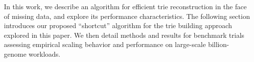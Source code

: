 In this work, we describe an algorithm for efficient trie reconstruction in the face of missing data, and explore its performance characteristics.
The following section introduces our proposed ``shortcut'' algorithm for the trie building approach explored in this paper.
We then detail methods and results for benchmark trials assessing empirical scaling behavior and performance on large-scale billion-genome workloads.

% 








